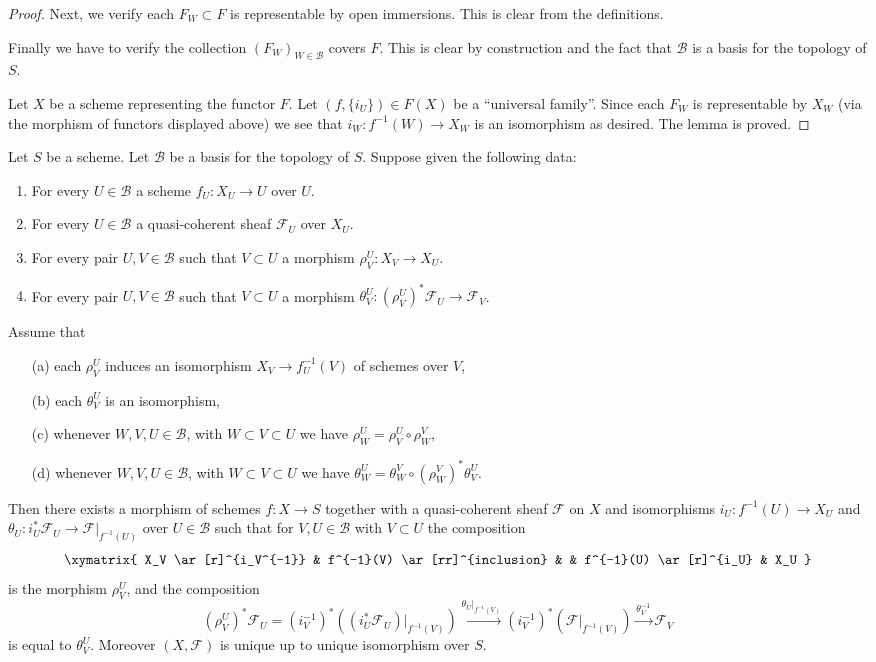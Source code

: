 \begin{proof}
\medskip\noindent
Next, we verify each $F_W \subset F$ is representable by open immersions.
This is clear from the definitions.

\medskip\noindent
Finally we have to verify
the collection $(F_W)_{W \in \mathcal{B}}$ covers $F$.
This is clear by construction and the fact that $\mathcal{B}$ is
a basis for the topology of $S$.

\medskip\noindent
Let $X$ be a scheme representing the functor $F$.
Let $(f, \{i_U\}) \in F(X)$ be a ``universal family''.
Since each $F_W$ is representable by $X_W$ (via the morphism of functors
displayed above) we see that $i_W : f^{-1}(W) \to X_W$
is an isomorphism as desired. The lemma is proved.
\end{proof}

\begin{lemma}
\label{lemma-relative-glueing-sheaves}
Let $S$ be a scheme.
Let $\mathcal{B}$ be a basis for the topology of $S$.
Suppose given the following data:
\begin{enumerate}
\item For every $U \in \mathcal{B}$ a scheme $f_U : X_U \to U$ over $U$.
\item For every $U \in \mathcal{B}$ a quasi-coherent sheaf $\mathcal{F}_U$
over $X_U$.
\item For every pair $U, V \in \mathcal{B}$ such that
$V \subset U$ a morphism $\rho^U_V : X_V \to X_U$.
\item  For every pair $U, V \in \mathcal{B}$ such that
$V \subset U$ a morphism
$\theta^U_V : (\rho^U_V)^*\mathcal{F}_U \to \mathcal{F}_V$.
\end{enumerate}
Assume that
\begin{enumerate}
\item[(a)] each $\rho^U_V$ induces an isomorphism
$X_V \to f_U^{-1}(V)$ of schemes over $V$,
\item[(b)] each $\theta^U_V$ is an isomorphism,
\item[(c)] whenever $W, V, U \in \mathcal{B}$, with
$W \subset V \subset U$ we have $\rho^U_W = \rho^U_V \circ \rho ^V_W$,
\item[(d)] whenever $W, V, U \in \mathcal{B}$, with
$W \subset V \subset U$ we have
$\theta^U_W = \theta^V_W \circ (\rho^V_W)^*\theta^U_V$.
\end{enumerate}
Then there exists a morphism of schemes $f : X \to S$
together with a quasi-coherent sheaf $\mathcal{F}$ on $X$
and isomorphisms $i_U : f^{-1}(U) \to X_U$ and
$\theta_U : i_U^*\mathcal{F}_U \to \mathcal{F}|_{f^{-1}(U)}$
over $U \in \mathcal{B}$ such that
for $V, U \in \mathcal{B}$ with $V \subset U$ the composition
$$
\xymatrix{
X_V \ar[r]^{i_V^{-1}} &
f^{-1}(V) \ar[rr]^{inclusion} & &
f^{-1}(U) \ar[r]^{i_U} &
X_U
}
$$
is the morphism $\rho^U_V$, and the composition
\begin{equation}
\label{equation-glue}
(\rho^U_V)^*\mathcal{F}_U
=
(i_V^{-1})^*((i_U^*\mathcal{F}_U)|_{f^{-1}(V)})
\xrightarrow{\theta_U|_{f^{-1}(V)}}
(i_V^{-1})^*(\mathcal{F}|_{f^{-1}(V)})
\xrightarrow{\theta_V^{-1}}
\mathcal{F}_V
\end{equation}
is equal to $\theta^U_V$. Moreover $(X, \mathcal{F})$ is unique
up to unique isomorphism over $S$.
\end{lemma}

